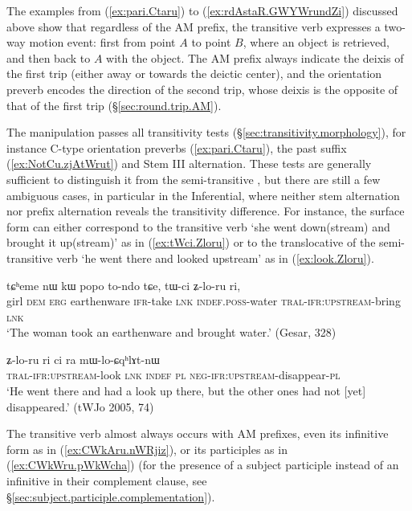 The examples from (\ref{ex:pari.Ctaru}) to (\ref{ex:rdAstaR.GWYWrundZi}) discussed above show that regardless of the AM prefix, the transitive verb  expresses a two-way motion event: first from point $A$ to point $B$, where an object is retrieved, and then back to $A$ with the object.  The AM prefix always indicate the deixis of the first trip (either away or towards the deictic center), and the orientation preverb encodes the direction of the second trip, whose deixis is the opposite of that of the first trip (§\ref{sec:round.trip.AM}).

The manipulation  passes all transitivity tests (§\ref{sec:transitivity.morphology}), for instance C-type orientation preverbs (\ref{ex:pari.Ctaru}), the past suffix  (\ref{ex:NotCu.zjAtWrut}) and Stem III alternation. These tests are generally sufficient to distinguish it from the semi-transitive , but there are still a few ambiguous cases, in particular in the Inferential, where neither stem alternation nor prefix alternation reveals the transitivity difference. For instance, the surface form  can either correspond to the transitive verb `she went down(stream) and brought it up(stream)' as in (\ref{ex:tWci.Zloru}) or to the translocative of the semi-transitive verb `he went there and looked upstream' as in (\ref{ex:look.Zloru}).

\begin{exe}
\ex \label{ex:tWci.Zloru}
\gll tɕʰeme nɯ kɯ popo to-ndo tɕe, tɯ-ci ʑ-lo-ru ri, \\
girl \textsc{dem} \textsc{erg} earthenware \textsc{ifr}-take \textsc{lnk} \textsc{indef}.\textsc{poss}-water \textsc{tral}-\textsc{ifr}:\textsc{upstream}-bring \textsc{lnk} \\
\glt `The woman took an earthenware and brought water.' (Gesar, 328)
\end{exe}

\begin{exe}
\ex \label{ex:look.Zloru}
\gll  ʑ-lo-ru ri ci ra mɯ-lo-ɕqʰlɤt-nɯ\\
\textsc{tral}-\textsc{ifr}:\textsc{upstream}-look \textsc{lnk} \textsc{indef} \textsc{pl} \textsc{neg}-\textsc{ifr}:\textsc{upstream}-disappear-\textsc{pl}\\
\glt `He went there and had a look up there, but the other ones had not [yet] disappeared.' (tWJo 2005, 74)
\end{exe}

The transitive verb  almost always occurs with AM prefixes, even its infinitive form  as in (\ref{ex:CWkAru.nWRjiz}), or its participles as in (\ref{ex:CWkWru.pWkWcha}) (for the presence of a subject participle instead of an infinitive in their complement clause, see §\ref{sec:subject.participle.complementation}).

